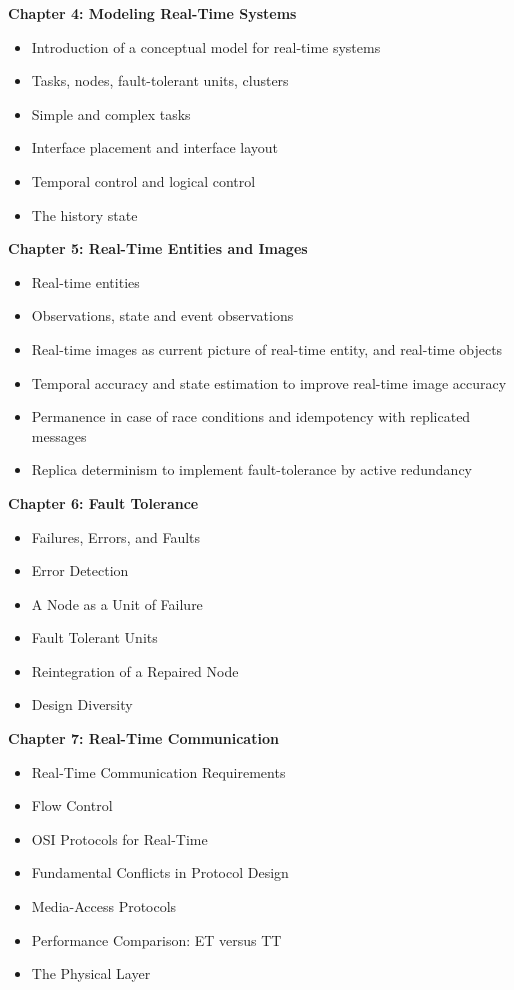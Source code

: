 \textbf{Chapter 4: Modeling Real-Time Systems}

\begin{itemize}
\item
  Introduction of a conceptual model for real-time systems
\item
  Tasks, nodes, fault-tolerant units, clusters
\item
  Simple and complex tasks
\item
  Interface placement and interface layout
\item
  Temporal control and logical control
\item
  The history state
\end{itemize}

\textbf{Chapter 5: Real-Time Entities and Images}

\begin{itemize}
\item
  Real-time entities
\item
  Observations, state and event observations
\item
  Real-time images as current picture of real-time entity, and real-time
  objects
\item
  Temporal accuracy and state estimation to improve real-time image
  accuracy
\item
  Permanence in case of race conditions and idempotency with replicated
  messages
\item
  Replica determinism to implement fault-tolerance by active redundancy
\end{itemize}

\textbf{Chapter 6: Fault Tolerance}

\begin{itemize}
\item
  Failures, Errors, and Faults
\item
  Error Detection
\item
  A Node as a Unit of Failure
\item
  Fault Tolerant Units
\item
  Reintegration of a Repaired Node
\item
  Design Diversity
\end{itemize}

\textbf{Chapter 7: Real-Time Communication}

\begin{itemize}
\item
  Real-Time Communication Requirements
\item
  Flow Control
\item
  OSI Protocols for Real-Time
\item
  Fundamental Conflicts in Protocol Design
\item
  Media-Access Protocols
\item
  Performance Comparison: ET versus TT
\item
  The Physical Layer
\end{itemize}

